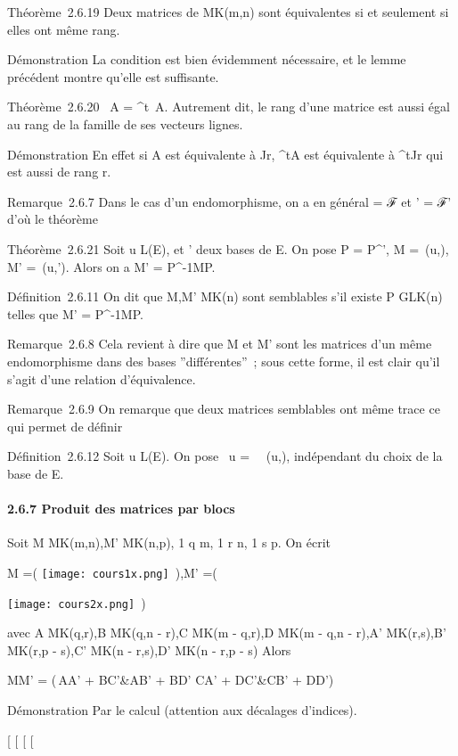Théorème~2.6.19 Deux matrices de MK(m,n) sont équivalentes si
et seulement si elles ont même rang.

Démonstration La condition est bien évidemment nécessaire, et le lemme
précédent montre qu'elle est suffisante.

Théorème~2.6.20 \mathrmrg~A
= \mathrmrg^t~A.
Autrement dit, le rang d'une matrice est aussi égal au rang de la
famille de ses vecteurs lignes.

Démonstration En effet si A est équivalente à Jr,
^tA est équivalente à ^tJr qui est aussi
de rang r.

Remarque~2.6.7 Dans le cas d'un endomorphisme, on a en général  = ℱ et
' = ℱ' d'où le théorème

Théorème~2.6.21 Soit u \in L(E),  et ' deux bases de E. On pose P =
P^', M =\
\mathrmMat (u,), M' =\
\mathrmMat (u,'). Alors on a M' =
P^-1MP.

Définition~2.6.11 On dit que M,M' \in MK(n) sont semblables s'il
existe P \in GLK(n) telles que M' = P^-1MP.

Remarque~2.6.8 Cela revient à dire que M et M' sont les matrices d'un
même endomorphisme dans des bases ''différentes''~; sous cette forme, il
est clair qu'il s'agit d'une relation d'équivalence.

Remarque~2.6.9 On remarque que deux matrices semblables ont même trace
ce qui permet de définir

Définition~2.6.12 Soit u \in L(E). On pose
~u
=\
\mathrm{tr}\mathrmMat~
(u,), indépendant du choix de la base  de E.

\paragraph{2.6.7 Produit des matrices par blocs}

Soit M \in MK(m,n),M' \in MK(n,p), 1 \leq q \leq m, 1 \leq r \leq n,
1 \leq s \leq p. On écrit

M =\left ( \texttt{[image: cours1x.png]}
\,\right ),\quad M'
=\left (

\texttt{[image: cours2x.png]} \,\right )

avec A \in MK(q,r),B \in MK(q,n - r),C \in MK(m
- q,r),D \in MK(m - q,n - r),A' \in MK(r,s),B' \in
MK(r,p - s),C' \in MK(n - r,s),D' \in MK(n -
r,p - s) Alors

MM' = \left (\matrix\,AA'
+ BC'&AB' + BD' \cr CA' + DC'&CB' +
DD'\right )

Démonstration Par le calcul (attention aux décalages d'indices).

{[}
{[}
{[}
{[}
